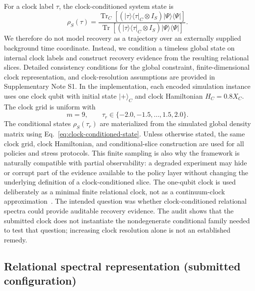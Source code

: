 \documentclass{iopjournal}
\begin{document}
For a clock label $\tau$, the clock-conditioned system state is
\begin{equation}
\rho_S(\tau)
=
\frac{
\operatorname{Tr}_{C}\!\left[
\left(|\tau\rangle\langle\tau|_{C}\otimes I_S\right)
|\Psi\rangle\langle\Psi|
\right]
}{
\operatorname{Tr}\!\left[
\left(|\tau\rangle\langle\tau|_{C}\otimes I_S\right)
|\Psi\rangle\langle\Psi|
\right]
}.
\label{eq:clock-conditioned-state}
\end{equation}
We therefore do not model recovery as a trajectory over an externally supplied
background time coordinate. Instead, we condition a timeless global state on
internal clock labels and construct recovery evidence from the resulting
relational slices. Detailed consistency conditions for the global constraint,
finite-dimensional clock representation, and clock-resolution assumptions are
provided in Supplementary Note S1.
In the implementation, each encoded simulation instance uses one clock qubit with
initial state $|+\rangle_C$ and clock Hamiltonian $H_C=0.8X_C$. The clock grid is
uniform with
\begin{equation}
m=9,\qquad
\tau_r\in\{-2.0,-1.5,\ldots,1.5,2.0\}.
\end{equation}
The conditional states $\rho_S(\tau_r)$ are materialized from the simulated global
density matrix using Eq.~\eqref{eq:clock-conditioned-state}. Unless otherwise
stated, the same clock grid, clock Hamiltonian, and conditional-slice construction
are used for all policies and stress protocols. This finite sampling is also why
the framework is naturally compatible with partial observability: a degraded
experiment may hide or corrupt part of the evidence available to the policy layer
without changing the underlying definition of a clock-conditioned slice.
The one-qubit clock is used deliberately as a minimal finite relational clock,
not as a continuum-clock
approximation~\cite{Foti2021ClassicalEquationsPageWootters,Rijavec2023RobustnessPageWootters}.
The intended question was whether clock-conditioned relational spectra could
provide auditable recovery evidence. The audit shows that the submitted clock
does not instantiate the nondegenerate conditional family needed to test that
question; increasing clock resolution alone is not an established remedy.

\subsection{Relational spectral representation (submitted configuration)}
\label{subsec:spectral-representation}
\end{document}
